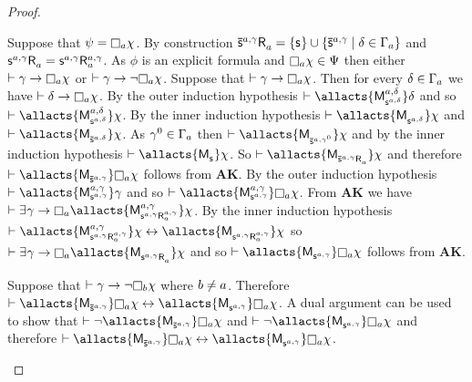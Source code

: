 \begin{proof}
\begin{enumerate}
        Suppose that $\psi = \necessary[\agentA] \chi$.
        By construction $\aPStateS[\agentA,\gamma] \aAccessibility{\agentA} = \{\aStateS\} \cup \{\aPStateS[\agentA,\gamma] \mid \delta \in \Gamma_\agentA\}$ and $\aStateS[\agentA,\gamma] \aAccessibility{\agentA} = \aStateS[\agentA,\gamma] \aAccessibility[\agentA,\gamma]{\agentA}$.
        As $\phi$ is an explicit formula and $\necessary[\agentA] \chi \in \Psi$ then either $\proves \gamma \implies \necessary[\agentA] \chi$ or $\proves \gamma \implies \neg \necessary[\agentA] \chi$.
        Suppose that $\proves \gamma \implies \necessary[\agentA] \chi$.
        Then for every $\delta \in \Gamma_a$ we have $\proves \delta \implies \necessary[\agentA] \chi$.
        By the outer induction hypothesis $\proves \allacts{\aPModel[\agentA,\delta]{\aStateS[\agentA,\delta]}} \delta$ and so $\proves \allacts{\aPModel[\agentA,\delta]{\aStateS[\agentA,\delta]}} \chi$.
        By the inner induction hypothesis $\proves \allacts{\aPModel{\aStateS[\agentA,\delta]}} \chi$ and $\proves \allacts{\aPModel{\aPStateS[\agentA,\delta]}} \chi$.
        As $\gamma^0 \in \Gamma_a$ then $\proves \allacts{\aPModel{\aPStateS[\agentA,\gamma^0]}} \chi$ and by the inner induction hypothesis $\proves \allacts{\aPModel{\aStateS}} \chi$.
        So $\proves \allacts{\aPModel{\aPStateS[\agentA,\gamma] \aAccessibility{\agentA}}} \chi$ and therefore $\proves \allacts{\aPModel{\aPStateS[\agentA,\gamma]}} \necessary[\agentA] \chi$ follows from {\bf AK}.
        By the outer induction hypothesis $\proves \allacts{\aPModel[\agentA,\gamma]{\aStateS[\agentA,\gamma]}} \gamma$ and so $\proves \allacts{\aPModel[\agentA,\gamma]{\aStateS[\agentA,\gamma]}} \necessary[\agentA] \chi$.
        From {\bf AK} we have $\proves \somerefs \gamma \implies \necessary[\agentA] \allacts{\aPModel[\agentA,\gamma]{\aStateS[\agentA,\gamma] \aAccessibility[\agentA,\gamma]{\agentA}}} \chi$.
        By the inner induction hypothesis $\proves \allacts{\aPModel[\agentA,\gamma]{\aStateS[\agentA,\gamma] \aAccessibility[\agentA,\gamma]{\agentA}}} \chi \iff \allacts{\aPModel{\aStateS[\agentA,\gamma] \aAccessibility[\agentA,\gamma]{\agentA}}} \chi$ so $\proves \somerefs \gamma \implies \necessary[\agentA] \allacts{\aPModel{\aStateS[\agentA,\gamma] \aAccessibility{\agentA}}} \chi$ and so $\proves \allacts{\aPModel{\aStateS[\agentA,\gamma]}} \necessary[\agentA] \chi$ follows from {\bf AK}.

        Suppose that $\proves \gamma \implies \neg \necessary[\agentB] \chi$ where $b \neq a$.
        Therefore $\proves \allacts{\aPModel{\aPStateS[\agentA,\gamma]}} \necessary[\agentA] \chi \iff \allacts{\aPModel{\aStateS[\agentA,\gamma]}} \necessary[\agentA] \chi$.
        A dual argument can be used to show that $\proves \neg \allacts{\aPModel{\aPStateS[\agentA,\gamma]}} \necessary[\agentA] \chi$ and $\proves \neg \allacts{\aPModel{\aStateS[\agentA,\gamma]}} \necessary[\agentA] \chi$ and therefore $\proves \allacts{\aPModel{\aPStateS[\agentA,\gamma]}} \necessary[\agentA] \chi \iff \allacts{\aPModel{\aStateS[\agentA,\gamma]}} \necessary[\agentA] \chi$.


\end{enumerate}
\end{proof}
